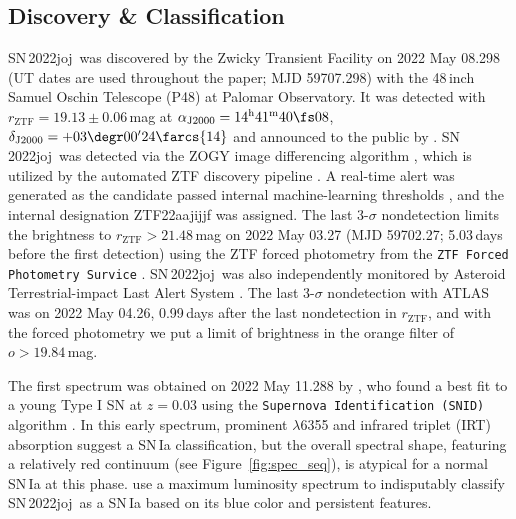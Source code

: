 \documentclass[twocolumn]{aastex631}
\newcommand{\sn}{SN\,2022joj}
\begin{document}
\begin{CJK*}{UTF8}{gbsn}
\subsection{Discovery \& Classification}
\sn\ was discovered by the Zwicky Transient Facility \citep[ZTF;][]{Bellm_ZTF_2019a,Graham_ZTF_2019,Dekany_ZTF_2020} on 2022 May 08.298 (UT dates are used throughout the paper; MJD 59707.298) with the 48\,inch Samuel Oschin Telescope (P48) at Palomar Observatory. It was detected with $r_\mathrm{ZTF}=19.13\pm0.06$\,mag at $\alpha_\mathrm{J2000}=14^\mathrm{h}41^\mathrm{m}40\fs08$, $\delta_\mathrm{J2000}=+03\degr00'24\farcs{14}$ and announced to the public by \citet{Fremling_2022TNSTR}. \sn\ was detected via the ZOGY image differencing algorithm \citep{Zackay_imagesub_2016}, which is utilized by the automated ZTF discovery pipeline \citep{Masci_ZTF_2019}. A real-time alert \citep{Patterson_ZTFalert_2019} was generated as the candidate passed internal machine-learning thresholds \citep[e.g.,][]{Duev_ZTFML_2019,Mahabal_ZTFML_2019}, and the internal designation ZTF22aajijjf was assigned. The last 3-$\sigma$ nondetection limits the brightness to $r_\mathrm{ZTF}>21.48$\,mag on 2022 May 03.27 (MJD 59702.27; 5.03\,days before the first detection) using the ZTF forced photometry from the \texttt{ZTF Forced Photometry Survice} \citep[\texttt{ZFPS};][]{Masci_ZTFforced_2023}. \sn\ was also independently monitored by Asteroid Terrestrial-impact Last Alert System \citep[ATLAS;][]{ATLAS_2018}. The last 3-$\sigma$ nondetection with ATLAS was on 2022 May 04.26, 0.99\,days after the last nondetection in $r_\mathrm{ZTF}$, and with the forced photometry we put a limit of brightness in the orange filter of $o>19.84$\,mag.

The first spectrum was obtained on 2022 May 11.288 by \citet{Newsome_2022TNSCR}, who found a best fit to a young Type I SN at $z=0.03$ using the \texttt{Supernova Identification (SNID)} algorithm \citep{Blondin_SNID_2007}. In this early spectrum, prominent  $\lambda$6355 and  infrared triplet (IRT) absorption suggest a SN\,Ia classification, but the overall spectral shape, featuring a relatively red continuum (see Figure~\ref{fig:spec_seq}), is atypical for a normal SN\,Ia at this phase. \citet{Chu_2022TNSCR} use a maximum luminosity spectrum to indisputably classify \sn\ as a SN\,Ia based on its blue color and persistent  features.


\end{CJK*}
\end{document}
